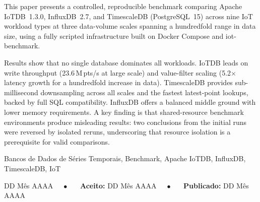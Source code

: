 \documentclass[brazilian]{presets/sbcreviews-2025}%
\begin{document}
\begin{frontmatter}
\begin{abstract-en}
    This paper presents a controlled, reproducible benchmark comparing Apache IoTDB~1.3.0,
    InfluxDB~2.7, and TimescaleDB (PostgreSQL~15) across nine IoT workload types at three
    data-volume scales spanning a hundredfold range in data size, using a fully scripted infrastructure
    built on Docker Compose and iot-benchmark.

    Results show that no single database dominates all workloads. IoTDB leads on write throughput
    (23.6\,M\,pts/s at large scale) and value-filter scaling (5.2$\times$ latency growth for
    a hundredfold increase in data). TimescaleDB provides sub-millisecond downsampling across all scales and the
    fastest latest-point lookups, backed by full SQL compatibility. InfluxDB offers a balanced
    middle ground with lower memory requirements. A key finding is that shared-resource benchmark
    environments produce misleading results: two conclusions from the initial runs were reversed
    by isolated reruns, underscoring that resource isolation is a prerequisite for valid comparisons.
  \end{abstract-en}

  \begin{keywords}
    Bancos de Dados de Séries Temporais, Benchmark, Apache IoTDB, InfluxDB, TimescaleDB, IoT
  \end{keywords}

  \begin{dates}
     DD Mês AAAA~~~$\bullet$~~~
    {\sffamily\textbf{Aceito:}} DD Mês AAAA~~~$\bullet$~~~
    {\sffamily\textbf{Publicado:}} DD Mês AAAA

  \end{dates}

\end{frontmatter}







\end{document}
